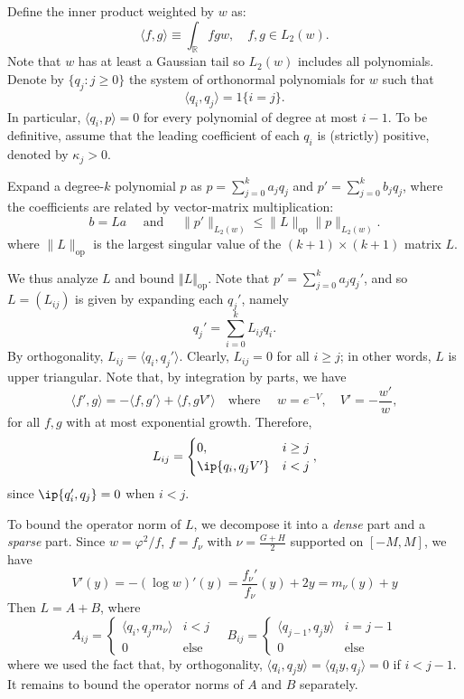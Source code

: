 \documentclass[letterpaper,11pt]{article}
\newcommand{\norm}[1]{{\left\Vert #1 \right\Vert}}
\newcommand{\reals}{\mathbb{R}}
\newcommand{\Iprod}[2]{\langle #1, #2 \rangle}
\newcommand{\indc}[1]{{1\{{#1}\}}}
\theoremstyle{definition}
\newcommand{\op}{\mathrm{op}}
\begin{document}
    Define the inner product weighted by $w$ as:
    \[
      \Iprod{f}{g} \equiv \int_\reals f g w, \quad f,g\in L_2(w).
    \]
    Note that $w$ has at least a Gaussian tail so $L_2(w)$ includes all polynomials.
    Denote by $\{q_j: j\geq 0\}$ the system of orthonormal polynomials for $w$ such that
    \[
      \Iprod{q_i}{q_j} = \indc{i=j}.
    \]
    In particular, $\Iprod{q_i}{p}=0$ for every polynomial of degree at most $i-1$.
    To be definitive, assume that the leading coefficient of each $q_i$ is (strictly) positive, denoted by $\kappa_j>0$.

    Expand a degree-$k$ polynomial $p$ as
    $p=\sum_{j=0}^k a_j q_j$ and
    $p'=
    \sum_{j=0}^k b_j q_j$, where the coefficients are related by vector-matrix multiplication:
    \[
      b = L a
    \quad \text{ and }\quad
      \|p'\|_{L_2(w)}
      \leq \|L\|_{\op} \|p\|_{L_2(w)}.
    \]
    where $ \|L\|_{\op}$ is the largest singular value of the $(k+1)\times (k+1)$ matrix $L$.

    We thus analyze $L$ and bound $\norm{L}_{\op}$. Note that $p'=\sum_{j=0}^k a_j q_j'$, and
    so $L= (L_ {ij})$ is given by expanding each $q_j'$, namely
    \[
      q_j' = \sum_{i=0}^k L_{ij} q_i.
    \]
    By orthogonality,
    $L_{ij} = \Iprod{q_i}{q_j'}$. Clearly, $L_{ij} = 0$ for all $i\geq j$; in other words, $L$ is upper triangular.
    Note that, by integration by parts, we have
    \begin{equation}
      \Iprod{f'}{g} =
      - \Iprod{f}{g'} + \Iprod{f}{gV'} \quad \text{where } \quad w = e^{-V}, \quad V'=-\frac{w'}{w}, 
      \label{eq:adjoint}
    \end{equation}
    for all $f,g$ with at most exponential growth.
    Therefore, \[
      L_{ij} =
      \begin{cases}
        0, & i \ge j\\
        \ip{q_i, q_j V'} &  i < j
      \end{cases},
    \]
    since $\ip{q_i', q_j} = 0$ when $ i < j$.

    To bound the operator norm of $L$, we decompose it into a \textit{dense} part and a \textit{sparse} part.
    Since $w = \varphi^2/f$, $f= f_\nu$ with $\nu=\frac{G+H}{2}$ supported on $[-M,M]$, we have
    \begin{equation}
      V'(y) = -(\log w)'(y) = \frac{f_\nu'}{f_\nu}(y) + 2 y = m_\nu(y) + y
      \label{eq:Vprime}
    \end{equation}
    Then
    $L=A+B$,
    where
    \[
      A_{ij} =
      \begin{cases}
        \Iprod{q_i}{q_j m_\nu}    & i < j\\
        0  &  \text{else}
      \end{cases}
      \quad
      B_{ij} =
      \begin{cases}
        \Iprod{q_{j-1}}{q_j y}    & i = j-1\\
        0   & \text{else}
      \end{cases}
    \]
    where we used the fact that,  by orthogonality,
    $\Iprod{q_i}{q_j y}=
    \Iprod{q_i y}{q_j}
    =0$ if $i<j-1$.
    It remains to bound the operator norms of $A$ and $B$ separately.
\end{document}
